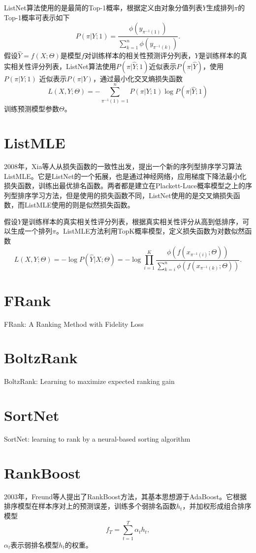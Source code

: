 ListNet算法使用的是最简的Top-1概率，根据定义由对象分值列表$Y$生成排列$\pi$的Top-1概率可表示如下
\[
    P(\pi|Y;1) = \frac{\phi(y_{\pi^{-1}(1)})}{\sum\limits_{k=1}^n \phi(y_{\pi^{-1}(k)})}.
\]
假设$\hat Y=f(X;\Theta)$是模型$f$对训练样本的相关性预测评分列表，$Y$是训练样本的真实相关性评分列表，ListNet算法使用$P(\pi|\hat Y;1)$近似表示$P(\pi|\hat Y)$，使用$P(\pi|Y;1)$ 近似表示$P(\pi|Y)$，通过最小化交叉熵损失函数
\[
    L(X,Y;\Theta) = -\sum\limits_{\pi^{-1}(1) = 1}^n P(\pi|Y;1) \log P(\pi|\hat Y;1)
\]
训练预测模型参数$\Theta$。

\section{ListMLE}
2008年，Xia等人\cite{xia2008listwise}从损失函数的一致性出发，提出一个新的序列型排序学习算法ListMLE。它是ListNet的一个拓展，也是通过神经网络，应用梯度下降法最小化损失函数，训练出最优排名函数。两者都是建立在Plackett-Luce概率模型之上的序列型排序学习方法，但是使用的损失函数不同，ListNet使用的是交叉熵损失函数，而ListMLE使用的则是似然损失函数。

假设$Y$是训练样本的真实相关性评分列表，根据真实相关性评分从高到低排序，可以生成一个排列$\pi$。ListMLE方法利用TopK概率模型，定义损失函数为对数似然函数
\[
    L(X,Y; \Theta) = -\log P(\hat Y|X; \Theta) = -\log \prod\limits_{i=1}^K \frac{\phi(f(x_{\pi^{-1}(i)};\Theta))}{\sum\limits_{k=i}^n \phi(f(x_{\pi^{-1}(k)};\Theta))}.
\]

\section{FRank}
FRank: A Ranking Method with Fidelity Loss\cite{tsai2007frank}

\section{BoltzRank}
BoltzRank: Learning to maximize expected ranking gain\cite{volkovs2009boltzrank}

\section{SortNet}
SortNet: learning to rank by a neural-based sorting algorithm\cite{rigutini2008sortnet}

\section{RankBoost}
2003年，Freund等人提出了RankBoost方法\cite{freund2003efficient}，其基本思想源于AdaBoost\cite{freund1995desicion,schapire1999improved}。它根据排序模型在样本序对上的预测误差，训练多个弱排名函数$h_t$，并加权形成组合排序模型
\[f_T = \sum\limits_{t=1}^T \alpha_t h_t,\]
$\alpha_t$表示弱排名模型$h_t$的权重。

